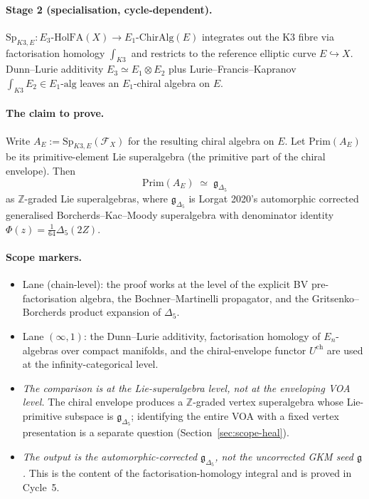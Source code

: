 \documentclass[11pt]{amsart}
\providecommand{\Z}{\mathbb{Z}}
\providecommand{\cF}{\mathcal{F}}
\providecommand{\fg}{\mathfrak{g}}
\providecommand{\gDelta}{\mathfrak{g}_{\Delta_5}}
\providecommand{\HolFA}{\mathrm{HolFA}}
\providecommand{\ChirAlg}{\mathrm{ChirAlg}}
\providecommand{\Sp}{\mathrm{Sp}}
\providecommand{\Prim}{\mathrm{Prim}}
\theoremstyle{plain}
\theoremstyle{definition}
\theoremstyle{remark}
\begin{document}
\paragraph{Stage 2 (specialisation, cycle-dependent).} $\Sp_{K3,E}:
E_3\text{-}\HolFA(X) \to E_1\text{-}\ChirAlg(E)$ integrates out the K3
fibre via factorisation homology $\int_{K3}$ and restricts to the reference
elliptic curve $E\hookrightarrow X$. Dunn--Lurie additivity
$E_3\simeq E_1\otimes E_2$ plus Lurie--Francis--Kapranov
$\int_{K3}E_2\in E_1\text{-alg}$ leaves an $E_1$-chiral algebra on $E$.

\paragraph{The claim to prove.} Write $A_E:=\Sp_{K3,E}(\cF_X)$ for the
resulting chiral algebra on $E$. Let $\Prim(A_E)$ be its primitive-element
Lie superalgebra (the primitive part of the chiral envelope). Then
\[
\boxed{\quad\Prim(A_E) \;\simeq\; \gDelta\quad}
\]
as $\Z$-graded Lie superalgebras, where $\gDelta$ is Lorgat 2020's
automorphic corrected generalised Borcherds--Kac--Moody superalgebra with
denominator identity $\Phi(z)=\tfrac{1}{64}\Delta_5(2Z)$.

\paragraph{Scope markers.}
\begin{itemize}[leftmargin=1.5em,itemsep=1pt]
\item Lane (chain-level): the proof works at the level of the explicit BV
pre-factorisation algebra, the Bochner--Martinelli propagator, and the
Gritsenko--Borcherds product expansion of $\Delta_5$.
\item Lane $(\infty,1)$: the Dunn--Lurie additivity, factorisation homology
of $E_n$-algebras over compact manifolds, and the chiral-envelope functor
$U^{\mathrm{ch}}$ are used at the infinity-categorical level.
\item \emph{The comparison is at the Lie-superalgebra level, not at the
enveloping VOA level.} The chiral envelope produces a $\Z$-graded
vertex superalgebra whose Lie-primitive subspace is $\gDelta$;
identifying the entire VOA with a fixed vertex presentation is a
separate question (Section~\ref{sec:scope-heal}).
\item \emph{The output is the automorphic-corrected $\gDelta$, not the
uncorrected GKM seed $\fg$.} This is the content of the
factorisation-homology integral and is proved in Cycle~5.
\end{itemize}
\end{document}
